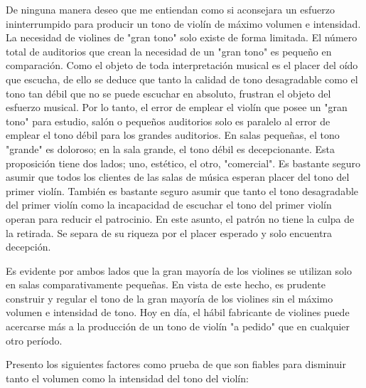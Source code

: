 \documentclass[12pt]{book}
\begin{document}
De ninguna manera deseo que me entiendan como si aconsejara un esfuerzo ininterrumpido para producir un tono de violín de máximo volumen e intensidad. La necesidad de violines de "gran tono" solo existe de forma limitada. El número total de auditorios que crean la necesidad de un "gran tono" es pequeño en comparación. Como el objeto de toda interpretación musical es el placer del oído que escucha, de ello se deduce que tanto la calidad de tono desagradable como el tono tan débil que no se puede escuchar en absoluto, frustran el objeto del esfuerzo musical. Por lo tanto, el error de emplear el violín que posee un "gran tono" para estudio, salón o pequeños auditorios solo es paralelo al error de emplear el tono débil para los grandes auditorios. En salas pequeñas, el tono "grande" es doloroso; en la sala grande, el tono débil es decepcionante. Esta proposición tiene dos lados; uno, estético, el otro, "comercial". Es bastante seguro asumir que todos los clientes de las salas de música esperan placer del tono del primer violín. También es bastante seguro asumir que tanto el tono desagradable del primer violín como la incapacidad de escuchar el tono del primer violín operan para reducir el patrocinio. En este asunto, el patrón no tiene la culpa de la retirada. Se separa de su riqueza por el placer esperado y solo encuentra decepción.

Es evidente por ambos lados que la gran mayoría de los violines se utilizan solo en salas comparativamente pequeñas. En vista de este hecho, es prudente construir y regular el tono de la gran mayoría de los violines sin el máximo volumen e intensidad de tono. Hoy en día, el hábil fabricante de violines puede acercarse más a la producción de un tono de violín "a pedido" que en cualquier otro período.

Presento los siguientes factores como prueba de que son fiables para disminuir tanto el volumen como la intensidad del tono del violín:
\end{document}
